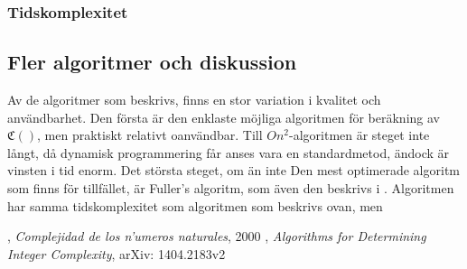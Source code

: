 \documentclass[a4paper,titlepage,swedish]{article}
\newcommand{\C}[1]{\mathfrak C \left( #1 \right)}
\theoremstyle{definition}
\begin{document}
\subsubsection{Tidskomplexitet}

\subsection{Fler algoritmer och diskussion}
 
Av de algoritmer som beskrivs, finns en stor variation i kvalitet och användbarhet. Den första är den enklaste möjliga algoritmen för
beräkning av $\C{}$, men praktiskt relativt oanvändbar. Till $O{n^2}$-algoritmen är steget inte långt, då dynamisk programmering får
anses vara en standardmetod, ändock är vinsten i tid enorm.
Det största steget, om än inte 
Den mest optimerade algoritm som finns för tillfället, är Fuller's algoritm, som även den beskrivs i \cite{algorithm_lune}.
Algoritmen har samma tidskomplexitet som algoritmen som beskrivs ovan, men 


\newpage
\begin{thebibliography}{9}

        , \emph{Complejidad de los n'umeros naturales}, 2000
     	, \emph{Algorithms for Determining Integer Complexity}, arXiv: 1404.2183v2

\end{thebibliography}
%
\end{document}
